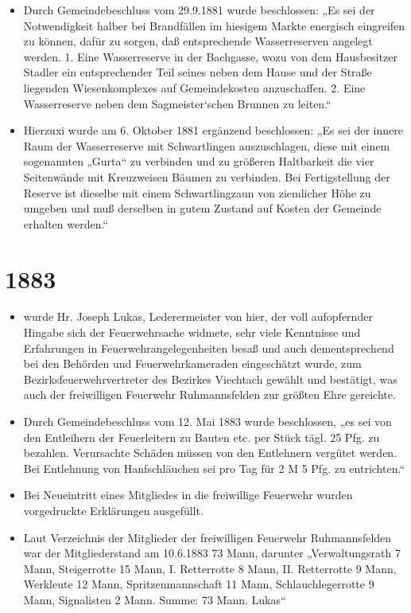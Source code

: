 \documentclass[12pt,a4paper]{book}
\begin{document}
\begin{itemize}
\item Durch Gemeindebeschluss vom 29.9.1881 wurde beschlossen: „Es sei der
Notwendigkeit halber bei Brandfällen im hiesigem Markte energisch eingreifen zu
können, dafür zu sorgen, daß entsprechende Wasserreserven angelegt werden. 1.
Eine Wasserreserve in der Bachgasse, wozu von dem Hausbesitzer Stadler ein
entsprechender Teil seines neben dem Hause und der Straße liegenden
Wiesenkomplexes auf Gemeindekosten anzuschaffen. 2. Eine Wasserreserve neben dem
Sagmeister`schen Brunnen zu leiten.“

\item Hierzuxi wurde am 6. Oktober 1881 ergänzend beschlossen: „Es sei der
innere Raum der Wasserreserve mit Schwartlingen auszuschlagen, diese mit einem
sogenannten „Gurta“ zu verbinden und zu größeren Haltbarkeit die vier
Seitenwände mit Kreuzweisen Bäumen zu verbinden. Bei Fertigstellung der Reserve
ist dieselbe mit einem Schwartlingzaun von ziemlicher Höhe zu umgeben und muß
derselben in gutem Zustand auf Kosten der Gemeinde erhalten werden.“
\end{itemize}

\section*{1883}

\begin{itemize}
\item wurde Hr. Joseph Lukas, Lederermeister von hier, der voll aufopfernder
Hingabe sich der Feuerwehrsache widmete, sehr viele Kenntnisse und Erfahrungen
in Feuerwehrangelegenheiten besaß und auch dementsprechend bei den Behörden und
Feuerwehrkameraden eingeschätzt wurde, zum Bezirksfeuerwehrvertreter des
Bezirkes Viechtach gewählt und bestätigt, was auch der freiwilligen Feuerwehr
Ruhmannsfelden zur größten Ehre gereichte.

\item Durch Gemeindebeschluss vom 12. Mai 1883 wurde beschlossen, „es sei von
den Entleihern der Feuerleitern zu Bauten etc. per Stück tägl. 25 Pfg. zu
bezahlen. Verursachte Schäden müssen von den Entlehnern vergütet werden. Bei
Entlehnung von Hanfschläuchen sei pro Tag für 2 M 5 Pfg. zu entrichten.“

\item Bei Neueintritt eines Mitgliedes in die freiwillige Feuerwehr wurden
vorgedruckte Erklärungen ausgefüllt.

\item Laut Verzeichnis der Mitglieder der freiwilligen Feuerwehr Ruhmannsfelden
war der Mitgliederstand am 10.6.1883 73 Mann, darunter „Verwaltungsrath 7 Mann,
Steigerrotte 15 Mann, I. Retterrotte 8 Mann, II. Retterrotte 9 Mann, Werkleute
12 Mann, Spritzenmannschaft 11 Mann, Schlauchlegerrotte 9 Mann, Signalisten 2
Mann. Summe: 73 Mann. Lukas“
\end{itemize}
\end{document}
